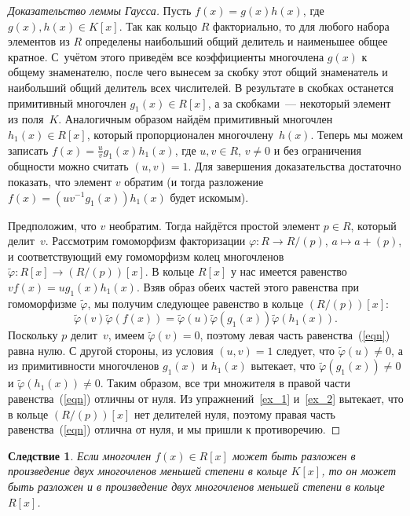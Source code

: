 \documentclass[a4paper,10pt]{amsart}
\newtheorem{corollary}{Следствие}
\theoremstyle{definition}
\theoremstyle{remark}
\begin{document}
\begin{proof}[Доказательство леммы Гаусса]
Пусть $f(x) = g(x)h(x)$, где $g(x), h(x)\in K[x]$. Так как кольцо
$R$ факториально, то для любого набора элементов из $R$ определены
наибольший общий делитель и наименьшее общее кратное. С~учётом этого
приведём все коэффициенты многочлена $g(x)$ к общему знаменателю,
после чего вынесем за скобку этот общий знаменатель и наибольший
общий делитель всех числителей. В результате в скобках останется
примитивный многочлен $g_1(x) \in R[x]$, а за скобками~--- некоторый
элемент из поля~$K$. Аналогичным образом найдём примитивный
многочлен $h_1(x) \in R[x]$, который пропорционален
многочлену~$h(x)$. Теперь мы можем записать $f(x)=\frac{u}{v}g_1(x)
h_1(x)$, где $u,v \in R$, $v \ne 0$ и без ограничения общности можно
считать $(u,v)=1$. Для завершения доказательства достаточно
показать, что элемент $v$ обратим (и тогда разложение $f(x) =
(uv^{-1}g_1(x))h_1(x)$ будет искомым).

Предположим, что $v$ необратим. Тогда найдётся простой элемент $p
\in R$, который делит~$v$. Рассмотрим гомоморфизм факторизации
$\varphi \colon R \to R/(p)$, $a \mapsto a + (p)$, и соответствующий
ему гомоморфизм колец многочленов $\widetilde \varphi \colon R[x]
\to (R/(p))[x]$. В кольце $R[x]$ у нас имеется равенство $vf(x) =
ug_1(x)h_1(x)$. Взяв образ обеих частей этого равенства при
гомоморфизме $\widetilde \varphi$, мы получим следующее равенство в
кольце $(R / (p))[x]$:
\begin{equation} \label{eqn}
\widetilde \varphi(v) \widetilde \varphi(f(x)) = \widetilde
\varphi(u) \widetilde \varphi(g_1(x)) \widetilde \varphi(h_1(x)).
\end{equation}
Поскольку $p$ делит~$v$, имеем $\widetilde \varphi(v) = 0$, поэтому
левая часть равенства~(\ref{eqn}) равна нулю. С другой стороны, из
условия $(u,v) = 1$ следует, что $\widetilde \varphi(u) \ne 0$, а из
примитивности многочленов $g_1(x)$ и $h_1(x)$ вытекает, что
$\widetilde \varphi(g_1(x)) \ne 0$ и $\widetilde \varphi(h_1(x)) \ne
0$. Таким образом, все три множителя в правой части
равенства~(\ref{eqn}) отличны от нуля. Из упражнений~\ref{ex_1}
и~\ref{ex_2} вытекает, что в кольце $(R / (p))[x]$ нет делителей
нуля, поэтому правая часть равенства~(\ref{eqn}) отлична от нуля, и
мы пришли к противоречию.
\end{proof}

\begin{corollary} \label{cc}
Если многочлен $f(x)\in R[x]$ может быть разложен в произведение
двух многочленов меньшей степени в кольце $K[x]$, то он может быть
разложен и в произведение двух многочленов меньшей степени в кольце
$R[x]$.
\end{corollary}
\end{document}
